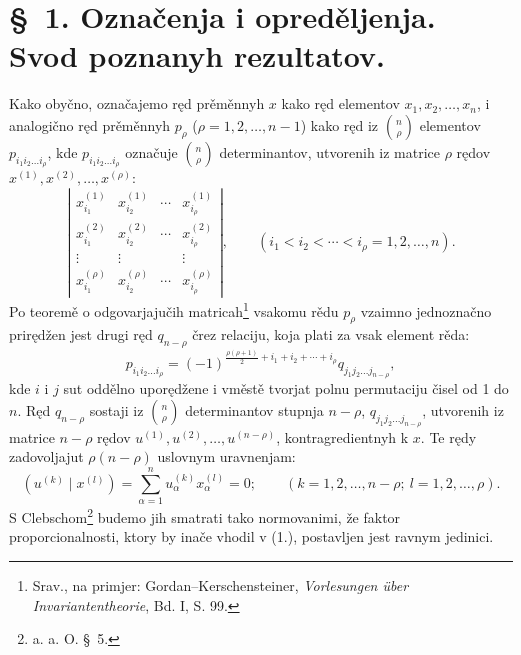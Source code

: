 \documentclass[11pt]{article}
\begin{document}
\section*{\S\ 1. Označenja i opreděljenja. Svod poznanyh rezultatov.}

Kako obyčno, označajemo ręd prěměnnyh $x$ kako ręd elementov $x_1,x_2,\ldots,x_n$, i analogično ręd prěměnnyh $p_\rho$ ($\rho=1,2,\ldots,n-1$) kako ręd iz $\binom n\rho$ elementov $p_{i_1i_2\ldots i_\rho}$, kde $p_{i_1i_2\ldots i_\rho}$ označuje $\binom n\rho$ determinantov, utvorenih iz matrice $\rho$ rędov $x^{(1)},x^{(2)},\ldots,x^{(\rho)}$:
\[
\left|\begin{array}{cccc}
 x_{i_1}^{(1)}&x_{i_2}^{(1)}&\cdots&x_{i_\rho}^{(1)}\\
 x_{i_1}^{(2)}&x_{i_2}^{(2)}&\cdots&x_{i_\rho}^{(2)}\\
 \vdots&\vdots&&\vdots\\
 x_{i_1}^{(\rho)}&x_{i_2}^{(\rho)}&\cdots&x_{i_\rho}^{(\rho)}
\end{array}\right|,
\qquad (i_1<i_2<\cdots<i_\rho=1,2,\ldots,n).
\]
Po teoremě o odgovarjajučih matricah\footnote{Srav., na primjer: Gordan--Kerschensteiner, \emph{Vorlesungen über Invariantentheorie}, Bd. I, S. 99.} vsakomu rědu $p_\rho$ vzaimno jednoznačno prirędžen jest drugi ręd $q_{n-\rho}$ črez relaciju, koja plati za vsak element rěda:
\begin{equation}
 p_{i_1i_2\ldots i_\rho}=(-1)^{\frac{\rho(\rho+1)}{2}+i_1+i_2+\cdots+i_\rho}q_{j_1j_2\ldots j_{n-\rho}},
\tag{1}
\end{equation}
kde $i$ i $j$ sut oddělno uporędžene i vměstě tvorjat polnu permutaciju čisel od 1 do $n$. Ręd $q_{n-\rho}$ sostaji iz $\binom n\rho$ determinantov stupnja $n-\rho$, $q_{j_1j_2\ldots j_{n-\rho}}$, utvorenih iz matrice $n-\rho$ rędov $u^{(1)},u^{(2)},\ldots,u^{(n-\rho)}$, kontragredientnyh k $x$. Te rędy zadovoljajut $\rho(n-\rho)$ uslovnym uravnenjam:
\begin{equation}
 (u^{(k)}\mid x^{(l)})=\sum_{\alpha=1}^{n}u_\alpha^{(k)}x_\alpha^{(l)}=0;
 \qquad (k=1,2,\ldots,n-\rho;\ l=1,2,\ldots,\rho).
\tag{2}
\end{equation}
S Clebschom\footnote{a. a. O. \S\ 5.} budemo jih smatrati tako normovanimi, že faktor proporcionalnosti, ktory by inače vhodil v (1.), postavljen jest ravnym jedinici.
\end{document}
